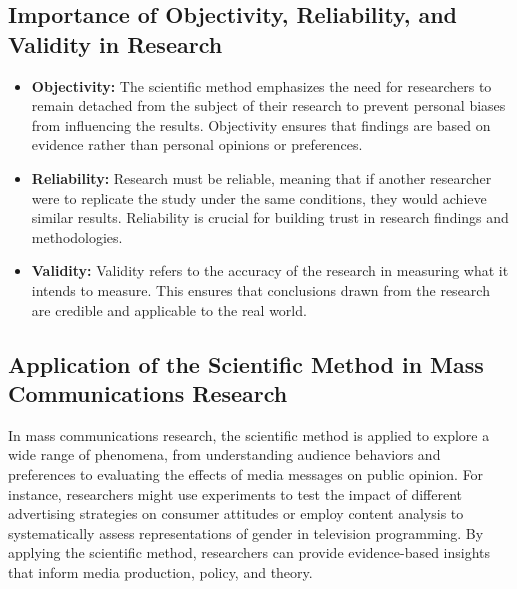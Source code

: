 \documentclass[
]{book}
\providecommand{\tightlist}{%
  \setlength{\itemsep}{0pt}\setlength{\parskip}{0pt}}
\begin{document}
\hypertarget{importance-of-objectivity-reliability-and-validity-in-research}{%
\subsection*{Importance of Objectivity, Reliability, and Validity in Research}\label{importance-of-objectivity-reliability-and-validity-in-research}}

\begin{itemize}
\tightlist
\item
  \textbf{Objectivity:} The scientific method emphasizes the need for researchers to remain detached from the subject of their research to prevent personal biases from influencing the results. Objectivity ensures that findings are based on evidence rather than personal opinions or preferences.
\item
  \textbf{Reliability:} Research must be reliable, meaning that if another researcher were to replicate the study under the same conditions, they would achieve similar results. Reliability is crucial for building trust in research findings and methodologies.
\item
  \textbf{Validity:} Validity refers to the accuracy of the research in measuring what it intends to measure. This ensures that conclusions drawn from the research are credible and applicable to the real world.
\end{itemize}

\hypertarget{application-of-the-scientific-method-in-mass-communications-research}{%
\subsection*{Application of the Scientific Method in Mass Communications Research}\label{application-of-the-scientific-method-in-mass-communications-research}}

In mass communications research, the scientific method is applied to explore a wide range of phenomena, from understanding audience behaviors and preferences to evaluating the effects of media messages on public opinion. For instance, researchers might use experiments to test the impact of different advertising strategies on consumer attitudes or employ content analysis to systematically assess representations of gender in television programming. By applying the scientific method, researchers can provide evidence-based insights that inform media production, policy, and theory.
\end{document}
